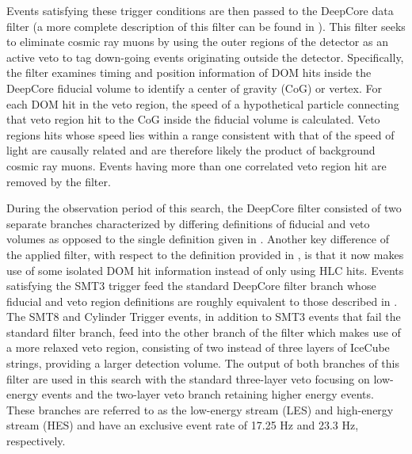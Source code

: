 \documentclass[manuscript]{aastex}
\begin{document}
Events satisfying these trigger conditions are then passed to the DeepCore data filter (a more complete description of this filter can be found in \cite{2012APh....35..615A}). This filter seeks to eliminate cosmic ray muons by using the outer regions of the detector as an active veto to tag down-going events originating outside the detector. Specifically, the filter examines timing and position information of DOM hits inside the DeepCore fiducial volume to identify a center of gravity (CoG) or vertex. For each DOM hit in the veto region, the speed of a hypothetical particle connecting that veto region hit to the CoG inside the fiducial volume is calculated. Veto regions hits whose speed lies within a range consistent with that of the speed of light are causally related and are therefore likely the product of background cosmic ray muons. Events having more than one correlated veto region hit are removed by the filter.

During the observation period of this search, the DeepCore filter consisted of two separate branches characterized by differing definitions of fiducial and veto volumes as opposed to the single definition given in \cite{2012APh....35..615A}. Another key difference of the applied filter, with respect to the definition provided in \cite{2012APh....35..615A}, is that it now makes use of some isolated DOM hit information instead of only using HLC hits. Events satisfying the SMT3 trigger feed the standard DeepCore filter branch whose fiducial and veto region definitions are roughly equivalent to those described in \cite{2012APh....35..615A}. The SMT8 and Cylinder Trigger events, in addition to SMT3 events that fail the standard filter branch, feed into the other branch of the filter which makes use of a more relaxed veto region, consisting of two instead of three layers of IceCube strings, providing a larger detection volume. The output of both branches of this filter are used in this search with the standard three-layer veto focusing on low-energy events and the two-layer veto branch retaining higher energy events. These branches are referred to as the low-energy stream (LES) and high-energy stream (HES) and have an exclusive event rate of 17.25 Hz and 23.3 Hz, respectively.
\end{document}
